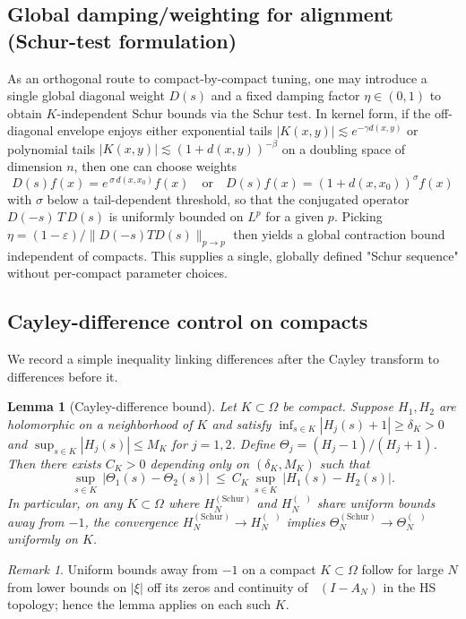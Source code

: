 \documentclass[11pt]{article}
\newtheorem{lemma}[theorem]{Lemma}
\theoremstyle{remark}
\newtheorem{remark}[theorem]{Remark}
\DeclareMathOperator{\dettwo}{det_2}
\begin{document}
\subsection{Global damping/weighting for alignment (Schur-test formulation)}\label{subsec:global-damping}
As an orthogonal route to compact-by-compact tuning, one may introduce a single global diagonal weight \(D(s)\) and a fixed damping factor \(\eta\in(0,1)\) to obtain \(K\)-independent Schur bounds via the Schur test. In kernel form, if the off-diagonal envelope enjoys either exponential tails \(|K(x,y)|\lesssim e^{-\gamma d(x,y)}\) or polynomial tails \(|K(x,y)|\lesssim (1+d(x,y))^{-\beta}\) on a doubling space of dimension \(n\), then one can choose weights
\[
 D(s)f(x)=e^{\,\sigma\,d(x,x_0)}f(x)\quad\text{or}\quad D(s)f(x)=(1+d(x,x_0))^{\sigma} f(x)
\]
with \(\sigma\) below a tail-dependent threshold, so that the conjugated operator \(D(-s)\,T\,D(s)\) is uniformly bounded on \(L^p\) for a given \(p\). Picking \(\eta=(1-\varepsilon)/\|D(-s)TD(s)\|_{p\to p}\) then yields a global contraction bound independent of compacts. This supplies a single, globally defined "Schur sequence" without per-compact parameter choices.

\subsection{Cayley-difference control on compacts}\label{subsec:Cayley-difference}
We record a simple inequality linking differences after the Cayley transform to differences before it.

\begin{lemma}[Cayley-difference bound]\label{lem:Cayley-diff}
Let \(K\subset\Omega\) be compact. Suppose \(H_1,H_2\) are holomorphic on a neighborhood of \(K\) and satisfy \(\inf_{s\in K}|H_j(s)+1|\ge \delta_K>0\) and \(\sup_{s\in K}|H_j(s)|\le M_K\) for \(j=1,2\). Define \(\Theta_j=(H_j-1)/(H_j+1)\). Then there exists \(C_K>0\) depending only on \((\delta_K,M_K)\) such that
\[
 \sup_{s\in K}\,\big|\Theta_1(s)-\Theta_2(s)\big|\ \le\ C_K\,\sup_{s\in K}\,\big|H_1(s)-H_2(s)\big|.
\]
In particular, on any \(K\subset\Omega\) where \(H_N^{(\mathrm{Schur})}\) and \(H_N^{(\dettwo)}\) share uniform bounds away from \(-1\), the convergence \(H_N^{(\mathrm{Schur})}\to H_N^{(\dettwo)}\) implies \(\Theta_N^{(\mathrm{Schur})}\to \Theta_N^{(\dettwo)}\) uniformly on \(K\).
\end{lemma}
\begin{remark}
Uniform bounds away from \(-1\) on a compact \(K\subset\Omega\) follow for large \(N\) from lower bounds on \(|\xi|\) off its zeros and continuity of \(\dettwo(I-A_N)\) in the HS topology; hence the lemma applies on each such \(K\).
\end{remark}
\end{document}
